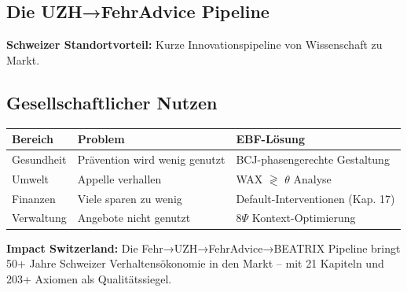 \documentclass[11pt,a4paper]{article}
\begin{document}
\subsection{Die UZH→FehrAdvice Pipeline}

\begin{center}
\end{center}

\textbf{Schweizer Standortvorteil:} Kurze Innovationspipeline von Wissenschaft zu Markt.

\subsection{Gesellschaftlicher Nutzen}

\begin{center}
\begin{tabular}{lll}
\toprule
\textbf{Bereich} & \textbf{Problem} & \textbf{EBF-Lösung} \\
\midrule
Gesundheit & Prävention wird wenig genutzt & BCJ-phasengerechte Gestaltung \\
Umwelt & Appelle verhallen & WAX $\gtrless$ $\theta$ Analyse \\
Finanzen & Viele sparen zu wenig & Default-Interventionen (Kap. 17) \\
Verwaltung & Angebote nicht genutzt & 8$\Psi$ Kontext-Optimierung \\
\bottomrule
\end{tabular}
\end{center}

\begin{summarybox}
\textbf{Impact Switzerland:} Die Fehr→UZH→FehrAdvice→BEATRIX Pipeline bringt 50+ Jahre Schweizer Verhaltensökonomie in den Markt -- mit 21 Kapiteln und 203+ Axiomen als Qualitätssiegel.
\end{summarybox}

\newpage

\end{document}
